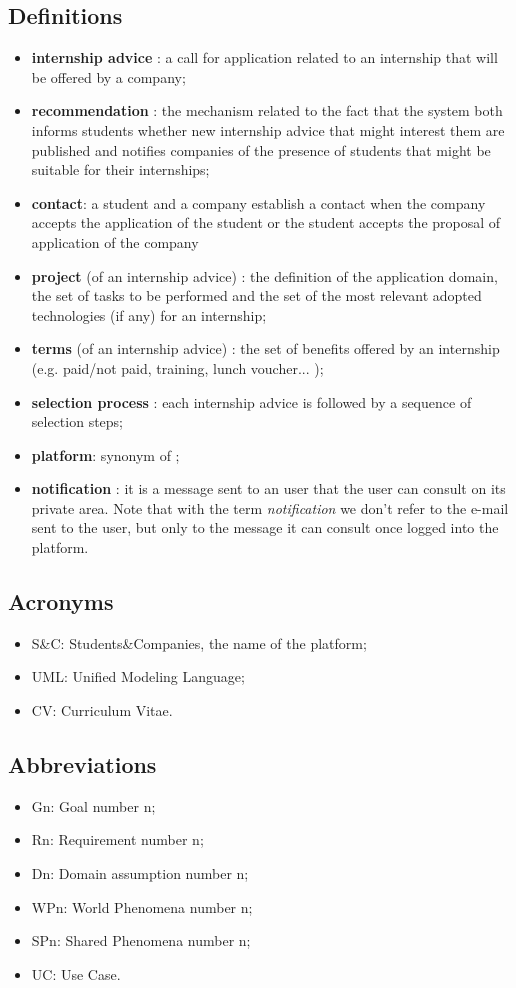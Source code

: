 		\subsection{Definitions}
			\begin{itemize}
				\item \textbf{internship advice} : a call for application related to an internship that will be offered by a company;
				\item \textbf{recommendation} : the mechanism related to the fact that the system both informs students whether new internship advice that might interest them are published and notifies companies of the presence of students that might be suitable for their internships;
				\item \textbf{contact}: a student and a company establish a contact when the company accepts the application of the student or the student accepts the proposal of application of the company
				\item \textbf{project} (of an internship advice) : the definition of the application domain, the set of tasks to be performed and the set of the most relevant adopted technologies (if any) for an internship;
				\item \textbf{terms} (of an internship advice) : the set of benefits offered by an internship (e.g. paid/not paid, training, lunch voucher... );
				\item \textbf{selection process} : each internship advice is followed by a sequence of selection steps;
				\item \textbf{platform}: synonym of ;
				\item \textbf{notification} : it is a message sent to an user that the user can consult on its private area. Note that with the term \emph{notification} we don't refer to the e-mail sent to the user, but only to the message it can consult once logged into the platform.
			\end{itemize}
		\subsection{Acronyms}
			\begin{itemize}
				\item S\&C: Students\&Companies, the name of the platform;
				\item UML: Unified Modeling Language;
				\item CV: Curriculum Vitae.
			\end{itemize}
		\subsection{Abbreviations}
			\begin{itemize}
				\item Gn: Goal number n;
				\item Rn: Requirement number n;
				\item Dn: Domain assumption number n;
				\item WPn: World Phenomena number n;
				\item SPn: Shared Phenomena number n;
				\item UC: Use Case.
			\end{itemize}
